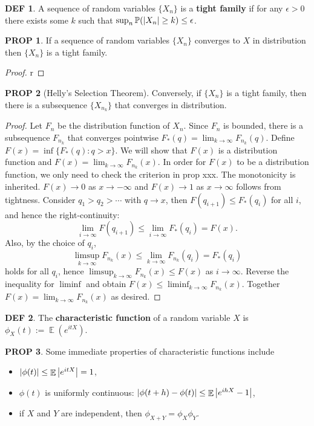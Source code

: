 \documentclass[hidelinks,11pt]{article}
\theoremstyle{definition}
\newtheorem*{defin}{DEF}
\theoremstyle{dotles}
\theoremstyle{dotless}
\newtheorem{prop}{PROP}[section]
\theoremstyle{remark}
\DeclareMathOperator{\E}{\mathbb{E}}
\begin{document}
\begin{defin}
A sequence of random variables $\{X_n\}$ is a \textbf{tight family} if for any $\epsilon>0$ there exists some $k$ such that $\sup_n\mathbb{P}(\abs{X_n}\geq k)\leq\epsilon$.
\end{defin}

\begin{prop}
If a sequence of random variables $\{X_n\}$ converges to $X$ in distribution then $\{X_n\}$ is a tight family.
\end{prop}
\begin{proof}
r
\end{proof}

\begin{prop}[Helly's Selection Theorem]
Conversely, if $\{X_n\}$ is a tight family, then there is a subsequence $\{X_{n_k}\}$ that converges in distribution.
\end{prop}
\begin{proof}
Let $F_n$ be the distribution function of $X_n$. Since $F_n$ is bounded, there is a subsequence $F_{n_k}$ that converges pointwise $F_\ast(q)=\lim_{k\to\infty}F_{n_k}(q)$. Define $F(x)=\inf\{F_\ast(q):q>x\}$. We will show that $F(x)$ is a distribution function and $F(x)=\lim_{k\to\infty}F_{n_k}(x)$.\smallbreak
In order for $F(x)$ to be a distribution function, we only need to check the criterion in prop xxx. The monotonicity is inherited. $F(x)\to0$ as $x\to-\infty$ and $F(x)\to1$ as $x\to\infty$ follows from tightness. Consider $q_1>q_2>\cdots$ with $q\to x$, then $F(q_{i+1})\leq F_\ast(q_i)$ for all $i$, and hence the right-continuity:
\[\lim_{i\to\infty}F(q_{i+1})\leq\lim_{i\to\infty}F_\ast(q_i)=F(x).\]
Also, by the choice of $q_i$,
\[\limsup_{k\to\infty}F_{n_k}(x)\leq\lim_{k\to\infty}F_{n_k}(q_i)=F_\ast(q_i)\]
holds for all $q_i$, hence $\limsup_{k\to\infty}F_{n_k}(x)\leq F(x)$ as $i\to\infty$. Reverse the inequality for $\liminf$ and obtain $F(x)\leq\liminf_{k\to\infty}F_{n_k}(x)$. Together $F(x)=\lim_{k\to\infty}F_{n_k}(x)$ as desired.
\end{proof}

\bigbreak
\begin{defin}
The \textbf{characteristic function} of a random variable $X$ is $\phi_X(t):=\E(e^{itX})$.
\end{defin}

\begin{prop}
Some immediate properties of characteristic functions include
\begin{itemize}
    \item $\abs{\phi(t)}\leq\E\abs{e^{itX}}=1$,
    \item $\phi(t)$ is uniformly continuous: $\abs{\phi(t+h)-\phi(t)}\leq\E\abs{e^{ihX}-1}$,
    \item if $X$ and $Y$ are independent, then $\phi_{X+Y}=\phi_X\phi_Y$.
\end{itemize}
\end{prop}
\end{document}
